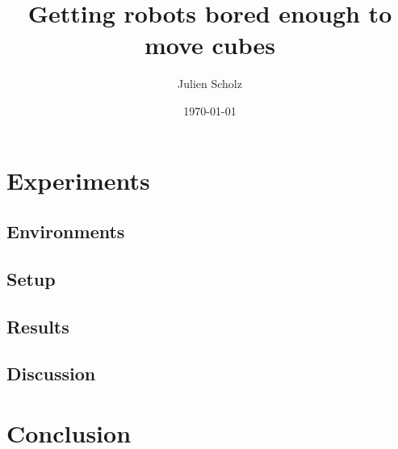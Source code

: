 \documentclass{article}
\title{Getting robots bored enough to move cubes}
\author{Julien Scholz}
\date{\today}
\begin{document}



\tableofcontents





\section{Experiments}
\subsection{Environments}
\subsection{Setup}
\subsection{Results}
\subsection{Discussion}

\section{Conclusion}



\end{document}
